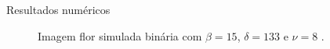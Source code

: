 \documentclass[10pt]{beamer}
\begin{document}
\begin{frame}{Resultados numéricos}
\begin{figure}[hbt]
	\caption{Imagem flor simulada binária com $\beta = 15$, $\delta = 133$ e $\nu = 8$ .}
\label{cap_acf_fig16}
\endminipage
\end{figure}
\end{frame}
\end{document}
